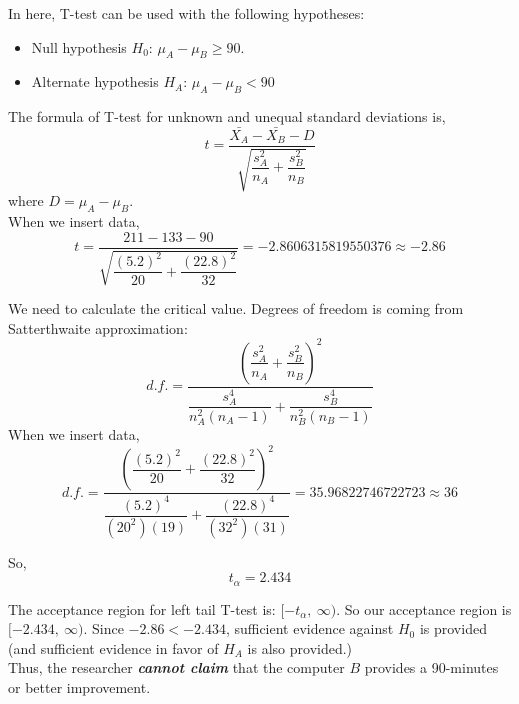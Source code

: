 In here, T-test can be used with the following hypotheses:
\begin{itemize}[leftmargin=.6cm]
  \item Null hypothesis $H_0$: $\mu_A - \mu_B \geq 90$.
  \item Alternate hypothesis $H_A$: $\mu_A - \mu_B < 90$
\end{itemize}

\noindent The formula of T-test for unknown and unequal standard deviations is,
\begin{equation*}
  t = \frac{\bar{X_A} - \bar{X_B} - D}{\sqrt{\dfrac{s_A^2}{n_A} + \dfrac{s_B^2}{n_B}}}
\end{equation*}
where $D = \mu_A - \mu_B$.\\

\noindent When we insert data,
\begin{equation*}
  t = \frac{211 - 133 - 90}{\sqrt{\dfrac{(5.2)^2}{20} + \dfrac{(22.8)^2}{32}}} = -2.8606315819550376 \approx -2.86
\end{equation*}

\noindent We need to calculate the critical value. Degrees of freedom is coming from  Satterthwaite approximation:
\begin{equation*}
  d.f. = \frac{ \left( \dfrac{s_A^2}{n_A} + \dfrac{s_B^2}{n_B} \right)^2}{\dfrac{s_A^4}{n_A^2(n_A-1)} + \dfrac{s_B^4}{n_B^2(n_B-1)}}
\end{equation*}
When we insert data,
\begin{equation*}
  d.f. = \frac{ \left( \dfrac{(5.2)^2}{20} + \dfrac{(22.8)^2}{32} \right)^2}{\dfrac{(5.2)^4}{(20^2)(19)} + \dfrac{(22.8)^4}{(32^2)(31)}} = 35.96822746722723 \approx 36
\end{equation*}

\noindent So,
\begin{equation*}
  t_{\alpha} =  2.434
\end{equation*}

\noindent The acceptance region for left tail T-test is: $[-t_{\alpha},\ \infty)$. So our acceptance region is $[-2.434,\ \infty)$. Since $-2.86 < -2.434$, sufficient evidence against $H_0$ is provided (and sufficient evidence in favor of $H_A$ is also provided.)\\

Thus, the researcher \textit{\textbf{cannot claim}} that the computer $B$ provides a 90-minutes or better improvement. 